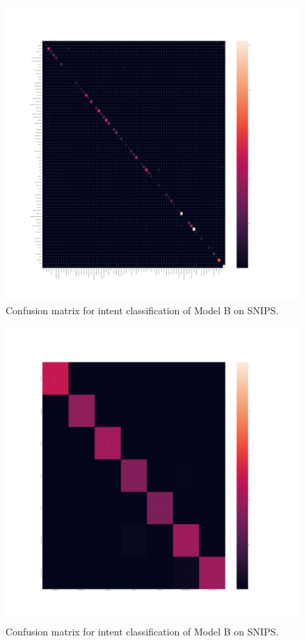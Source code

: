 \documentclass[a4paper]{article}
\begin{document}
\begin{figure}[!h]
    \centering
    \includegraphics[width=0.8\linewidth]{../cm/cm-model-b-snips-slot.png}
    \caption{Confusion matrix for intent classification of Model B on SNIPS.}
    \label{fig:cm-model-b-snips-slot}
\end{figure}

\begin{figure}[!h]
    \centering
    \includegraphics[width=0.8\linewidth]{../cm/cm-model-b-snips-intent.png}
    \caption{Confusion matrix for intent classification of Model B on SNIPS.}
    \label{fig:cm-model-b-snips-intent}
\end{figure}
\end{document}
